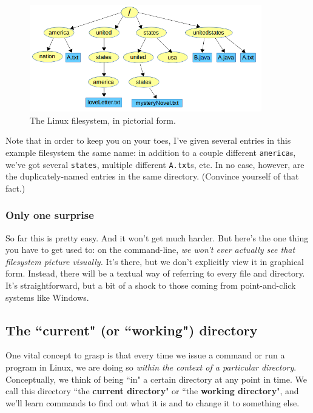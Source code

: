 \begin{figure}[ht]
\centering
\includegraphics[width=0.9\textwidth]{tree.png}  %
\caption{The Linux filesystem, in pictorial form.}
\label{fig:tree}
\end{figure}

Note that in order to keep you on your toes, I've given several entries in
this example filesystem the same name: in addition to a couple different
\texttt{america}s, we've got several \texttt{states}, multiple different
\texttt{A.txt}s, etc. In no case, however, are the duplicately-named entries
in the same directory. (Convince yourself of that fact.)

\subsubsection{Only one surprise}

So far this is pretty easy. And it won't get much harder. But here's the one
thing you have to get used to: on the command-line, \textit{we won't ever
actually see that filesystem picture visually.} It's there, but we don't
explicitly view it in graphical form. Instead, there will be a textual way of
referring to every file and directory. It's straightforward, but a bit of a
shock to those coming from point-and-click systems like Windows.

\subsection{The ``current" (or ``working") directory}

One vital concept to grasp is that every time we issue a command or run a
program in Linux, we are doing so \textit{within the context of a particular
directory}. Conceptually, we think of being ``in" a certain directory at any
point in time. We call this directory ``the \textbf{current directory}" or
``the \textbf{working directory}", and we'll learn commands to find out what
it is and to change it to something else.

